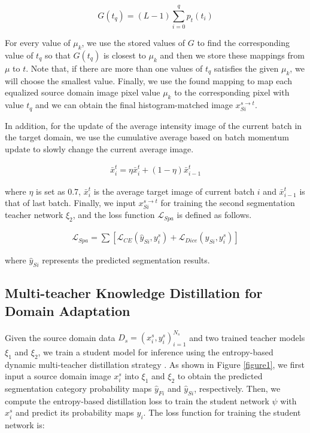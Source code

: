 \documentclass[letterpaper]{article} %
\begin{document}
{\small  
\begin{equation}
    G(t_q)=(L-1) \sum_{i=0}^{q}p_t(t_i)\label{eq4}
\end{equation}
}

For every value of $\mu_k$, we use the stored values of $G$ to find the corresponding value of $t_q$ so that $G(t_q)$ 
is closest to $\mu_k$ and then we store these mappings from $\mu$ to $t$. Note that, if there are more than one values 
of $t_q$ satisfies the given $\mu_k$, we will choose the smallest value. Finally, we use the found mapping to map 
each equalized source domain image pixel value $\mu_k$ to the corresponding pixel with value $t_q$ 
and we can obtain the final histogram-matched image $x_{Si}^{s\to{t}}$.

In addition, for the update of the average intensity image of the current batch in the target domain, we use 
the cumulative average based on batch momentum update to slowly change the current average image. 

{\small  
\begin{align}
    \bar{x}_i^t=\eta\bar{x}_i^t+(1-\eta)\bar{x}_{i-1}^t\label{eq5}
\end{align}
}

\noindent
where $\eta$ is set as 0.7, $\bar{x}_i^t$ is the average target image of current batch $i$ and $\bar{x}_{i-1}^t$ is that of last batch. Finally, we input $x_{Si}^{s\to{t}}$ for training the second segmentation teacher 
network $\xi_2$, and the loss function $\mathcal{L}_{Spa}$ is defined as follows.

{\small  
\begin{align}
    \mathcal{L}_{Spa}=\sum\left[ \mathcal{L}_{CE}\left(\hat{y}_{Si},y_i^s\right)+ \mathcal{L}_{Dice} \left(\hat{y}_{Si},y_i^s \right)\right]\label{eq6}
\end{align}
}

\noindent
where $\hat{y}_{Si}$ represents the predicted segmentation results.

\subsection{Multi-teacher Knowledge Distillation for Domain Adaptation}

Given the source domain data $D_s={(x_i^s,y_i^s)}_{i=1}^{N_s}$ and two trained teacher models  $\xi_1$ and $\xi_2$, 
we train a student model for inference using the entropy-based 
dynamic multi-teacher distillation strategy \cite{34}. As shown in Figure \ref{figure1}, we first 
input a source domain image $x_i^s$ into $\xi_1$ and $\xi_2$ to obtain the predicted 
segmentation category probability maps $\hat{y}_{Fi}$ and $\hat{y}_{Si}$, respectively. Then, we compute the entropy-based distillation 
loss to train the student network $\psi$ with $x_i^s$ and predict its probability maps $\hat{y}_{i}$. 
The loss function for training the student network is:
\end{document}
